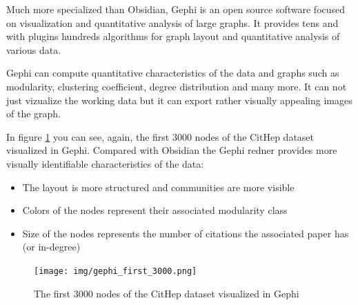 

Much more specialized than Obsidian, Gephi is an open source software focused on visualization and quantitative analysis of large graphs.
It provides tens and with plugins hundreds  algorithms for graph layout and quantitative analysis of various data.

Gephi can compute quantitative characteristics of the data and graphs such as modularity, clustering coefficient, degree distribution and many more.
It can not just vizualize the working data but it can export rather visually appealing images of the graph.

In figure \ref{obr:gephi_cithep_3k} you can see, again, the first 3000 nodes of the CitHep dataset visualized in Gephi.
Compared with Obsidian the Gephi redner provides more visually identifiable characteristics of the data:
\begin{itemize}
  \item The layout is more structured and communities are more visible
  \item Colors of the nodes represent their associated modularity class
  \item Size of the nodes represents the number of citations the associated paper has (or in-degree)
\end{itemize}




\begin{figure}[p]\centering
  \texttt{[image: img/gephi\_first\_3000.png]}
  \caption{The first 3000 nodes of the CitHep dataset visualized in Gephi}
  \label{obr:gephi_cithep_3k}
\end{figure}


